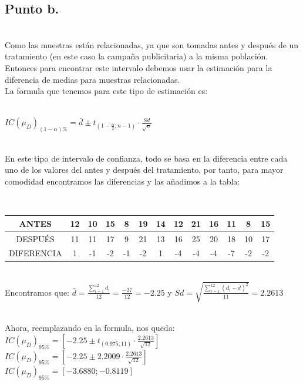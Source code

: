 \documentclass[letterpaper,12pt,onecolumn,titlepage]{article}
\begin{document}
\subsection{Punto b.}
~\\ Como las muestras est\'{a}n relacionadas, ya que son tomadas antes y despu\'{e}s de un tratamiento (en este caso la campa\~{n}a publicitaria) a la misma poblaci\'{o}n. Entonces para encontrar este intervalo debemos usar la estimaci\'{o}n para la diferencia de medias para muestras relacionadas.
~\\ La formula que tenemos para este tipo de estimaci\'{o}n es:

~\\ $IC(\mu_{D})_{(1-\alpha)\%}=\bar{d} \pm t_{(1-\frac{\alpha}{2};n-1)}\cdot\frac{Sd}{\sqrt{n}}$

~\\ En este tipo de intervalo de confianza, todo se basa en la diferencia entre cada uno de los valores del antes y despu\'{e}s del tratamiento, por tanto, para mayor comodidad encontramos las diferencias y las a\~{n}adimos a la tabla:
 
~\\ \begin{center}
 \begin{tabular}{|c|c|c|c|c|c|c|c|c|c|c|c|c|}
\hline 
\rule[-1ex]{0pt}{2.5ex} ANTES & 12 & 10 & 15 & 8 & 19 & 14 & 12 & 21 & 16 & 11 & 8 & 15 \\ 
\hline 
\rule[-1ex]{0pt}{2.5ex} DESPU\'{E}S & 11 & 11 & 17 & 9 & 21 & 13 & 16 & 25 & 20 & 18 & 10 & 17 \\ 
\hline 
\rule[-1ex]{0pt}{2.5ex} DIFERENCIA & 1 & -1 & -2 & -1 & -2 & 1 & -4 & -4 & -4 & -7 & -2 & -2 \\ 
\hline 
\end{tabular} 
\end{center}

~\\ Encontramos que: $\bar{d}=\frac{\sum\limits_{i=1}^{12}d_{i}}{12}=\frac{-27}{12}=-2.25$ y $Sd=\sqrt{\frac{\sum\limits_{i=1}^{12}(d_{i}-\bar{d})^2}{11}}=2.2613$

~\\ Ahora, reemplazando en la formula, nos queda:
~\\ $IC(\mu_{D})_{95\%}=[-2.25 \pm t_{(0.975;11)}\cdot \frac{2.2613}{\sqrt{12}}]$
~\\ $IC(\mu_{D})_{95\%}=[-2.25 \pm 2.2009 \cdot \frac{2.2613}{\sqrt{12}}]$
~\\ $IC(\mu_{D})_{95\%}=[-3.6880 ; -0.8119]$
\end{document}
